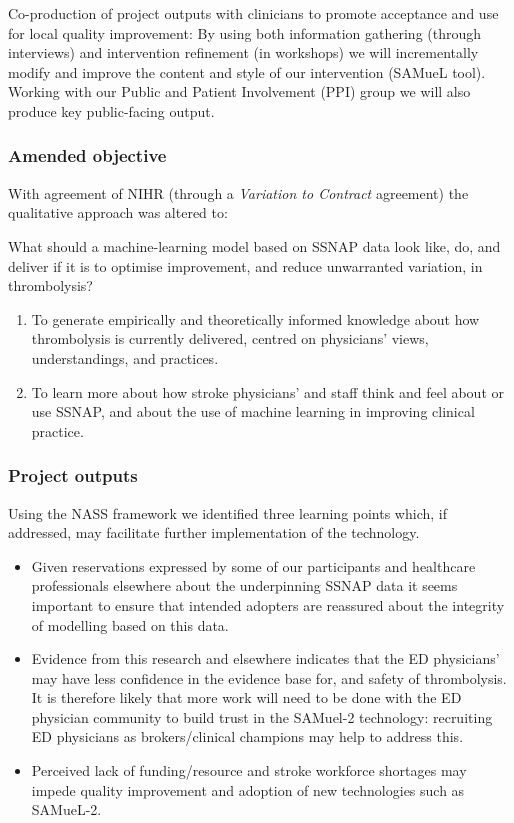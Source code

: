 Co-production of project outputs with clinicians to promote acceptance and use for local quality improvement: By using both information gathering (through interviews) and intervention refinement (in workshops) we will incrementally modify and improve the content and style of our intervention (SAMueL tool). Working with our Public and Patient Involvement (PPI) group we will also produce key public-facing output.

\subsubsection*{Amended objective}

With agreement of NIHR (through a \textit{Variation to Contract} agreement) the qualitative approach was altered to:

What should a machine-learning model based on SSNAP data look like, do, and deliver if it is to optimise improvement, and reduce unwarranted variation, in thrombolysis?

\begin{enumerate}
    \item To generate empirically and theoretically informed knowledge about how thrombolysis is currently delivered, centred on physicians’ views, understandings, and practices.
    \item To learn more about how stroke physicians’ and staff think and feel about or use SSNAP, and about the use of machine learning in improving clinical practice.
\end{enumerate}


\subsubsection*{Project outputs}


Using the NASS framework we identified three learning points which, if addressed, may facilitate further implementation of the technology. 

\begin{itemize}
    \item Given reservations expressed by some of our participants and healthcare professionals elsewhere about the underpinning SSNAP data it seems important to ensure that intended adopters are reassured about the integrity of modelling based on this data.
    \item Evidence from this research and elsewhere indicates that the ED physicians’ may have less confidence in the evidence base for, and safety of thrombolysis. It is therefore likely that more work will need to be done with the ED physician community to build trust in the SAMuel-2 technology: recruiting ED physicians as brokers/clinical champions may help to address this.
    \item Perceived lack of funding/resource and stroke workforce shortages may impede quality improvement and adoption of new technologies such as SAMueL-2.
\end{itemize}